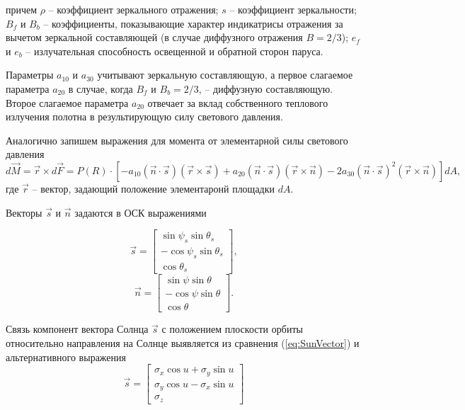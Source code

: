 причем $\rho$ -- коэффициент зеркального отражения; $s$ -- коэффициент зеркальности;
$B_f$ и $B_b$ -- коэффициенты, показывающие характер индикатрисы отражения за вычетом
зеркальной составляющей (в случае диффузного отражения $B = 2/3$); $e_f$ и $e_b$ --
излучательная способность освещенной и обратной сторон паруса.\par
  Параметры $a_{10}$ и $a_{30}$ учитывают зеркальную составляющую, а первое слагаемое
параметра $a_{20}$ в случае, когда $B_f$ и $B_b = 2/3$, -- диффузную составляющую.
Второе слагаемое параметра $a_{20}$ отвечает за вклад собственного теплового излучения
полотна в результирующую силу светового давления.\par
  Аналогично запишем выражения для момента от элементарной силы светового давления
\begin{equation}
  d\vec{M} = \vec{r} \times d\vec{F} = P(R) \cdot \left[
    -a_{10}(\vec{n}\cdot\vec{s})(\vec{r} \times \vec{s})
    +a_{20}(\vec{n}\cdot\vec{s})(\vec{r} \times \vec{n})
    -2a_{30}(\vec{n}\cdot\vec{s})^2(\vec{r} \times \vec{n})
  \right]dA,
\end{equation}
где $\vec{r}$ -- вектор, задающий положение элементаронй площадки $dA$.\par
  Векторы $\vec{s}$ и $\vec{n}$ задаются в ОСК выражениями\par
\begin{equation} \label{eq:SunVector}
  \vec{s} = \begin{bmatrix}
     \sin\psi_s\sin\theta_s \\
    -\cos\psi_s\sin\theta_s \\
     \cos\theta_s
  \end{bmatrix},
\end{equation}
\begin{equation}
  \vec{n} = \begin{bmatrix}
     \sin\psi\sin\theta \\
    -\cos\psi\sin\theta \\
     \cos\theta
  \end{bmatrix}.
\end{equation}\par
Связь компонент вектора Солнца $\vec{s}$ с положением плоскости орбиты относительно
направления на Солнце выявляется из сравнения (\ref{eq:SunVector}) и альтернативного
выражения
\begin{equation}
  \vec{s} = \begin{bmatrix}
    \sigma_x\cos u + \sigma_y\sin u \\
    \sigma_y\cos u - \sigma_x\sin u \\
    \sigma_z
  \end{bmatrix}
\end{equation}
